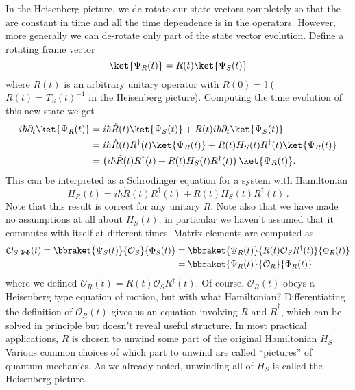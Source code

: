 In the Heisenberg picture, we de-rotate our state vectors completely so that the are constant in time and all the time dependence is in the operators.
However, more generally we can de-rotate only part of the state vector evolution.
Define a rotating frame vector
\begin{equation}
  \ket{\Psi_R(t)} = R(t) \ket{\Psi_S(t)}
\end{equation}
where $R(t)$ is an arbitrary unitary operator with $R(0) = \mathbb{I}$ ($R(t) = T_S(t)^{-1}$ in the Heisenberg picture).
Computing the time evolution of this new state we get
\begin{align}
  i\hbar\partial_t \ket{\Psi_R(t)} &= i\hbar \dot{R}(t) \ket{\Psi_S(t)} + R(t) i \hbar\partial_t\ket{\Psi_S(t)} \nonumber \\
  &= i\hbar \dot{R}(t)R^{\dagger}(t) \ket{\Psi_R(t)} + R(t) H_S(t) R^{\dagger}(t) \ket{\Psi_R(t)} \nonumber \\
  &= \left( i\hbar \dot{R}(t)R^\dagger(t) + R(t) H_S(t) R^{\dagger}(t) \right) \ket{\Psi_R(t)}.
\end{align}
This can be interpreted as a Schrodinger equation for a system with Hamiltonian
\begin{equation}
  H_R(t) = i\hbar \dot{R}(t)R^{\dagger}(t) + R(t) H_S(t) R^{\dagger}(t) \, .
\end{equation}
Note that this result is correct for any unitary $R$.
Note also that we have made no assumptions at all about $H_S(t)$; in particular we haven't assumed that it commutes with itself at different times.
Matrix elements are computed as
\begin{align}
  \mathcal{O}_{S,\Psi\Phi}(t) = \bbraket{\Psi_S(t)}{\mathcal{O}_S}{\Phi_S(t)}
  &= \bbraket{\Psi_R(t)}{R(t) \mathcal{O}_S R^\dagger(t)}{\Phi_R(t)} \nonumber \\
  &= \bbraket{\Psi_R(t)}{\mathcal{O}_R}{\Phi_R(t)}
\end{align}
where we defined $\mathcal{O}_R(t) = R(t) \mathcal{O}_S R^\dagger(t)$.
Of course, $\mathcal{O}_R(t)$ obeys a Heisenberg type equation of motion, but with what Hamiltonian?
Differentiating the definition of $\mathcal{O}_R(t)$ gives us an equation involving $\dot{R}$ and $\dot{R}^\dagger$, which can be solved in principle but doesn't reveal useful structure.
In most practical applications, $R$ is chosen to unwind some part of the original Hamiltonian $H_S$.
Various common choices of which part to unwind are called ``pictures'' of quantum mechanics.
As we already noted, unwinding all of $H_S$ is called the Heisenberg picture.
